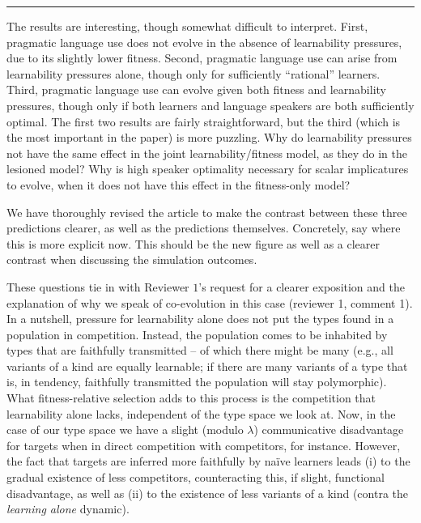 \documentclass[12pt,a4paper]{article}
\newcommand{\hl}[1]{\textcolor[rgb]{.8,.33,.0}{#1}}%
\begin{document}
\vspace{0.5cm}




\noindent\rule{\textwidth}{1pt}

\begin{mdframed}[backgroundcolor=gray!25,linecolor=gray!25,frametitle= Reviewer \thereviewerCounter~comment \thereviewerCommentCounter \hfill ~~({\it Interpretation of results})]
%
The results are interesting, though somewhat difficult to interpret. First, pragmatic language use does not evolve in the absence of learnability pressures, due to its slightly lower fitness. Second, pragmatic language use can arise from learnability pressures alone, though only for sufficiently ``rational'' learners. Third, pragmatic language use can evolve given both fitness and learnability pressures, though only if both learners and language speakers are both sufficiently optimal. The first two results are fairly straightforward, but the third (which is the most important in the paper) is more puzzling. Why do learnability pressures not have the same effect in the joint learnability/fitness model, as they do in the lesioned model? Why is high speaker optimality necessary for scalar implicatures to evolve, when it does not have this effect in the fitness-only model?
\end{mdframed}

We have thoroughly revised the article to make the contrast between these three predictions clearer, as well as the predictions themselves. Concretely, \hl{say where this is more explicit now. This should be the new figure as well as a clearer contrast when discussing the simulation outcomes}.

These questions tie in with Reviewer $1$'s request for a clearer exposition and the explanation of why we speak of co-evolution in this case (reviewer 1, comment 1). In a nutshell, pressure for learnability alone does not put the types found in a population in competition. Instead, the population comes to be inhabited by types that are faithfully transmitted -- of which there might be many (e.g., all variants of a kind are equally learnable; if there are many variants of a type that is, in tendency, faithfully transmitted the population will stay polymorphic). What fitness-relative selection adds to this process is the competition that learnability alone lacks, independent of the type space we look at. Now, in the case of our type space we have a slight (modulo $\lambda$) communicative disadvantage for targets  when in direct competition with competitors, for instance. However, the fact that targets are inferred more faithfully by na\"ive learners leads (i) to the gradual existence of less competitors, counteracting this, if slight, functional disadvantage, as well as (ii) to the existence of less variants of a kind (contra the {\em learning alone} dynamic).
%
\end{document}
